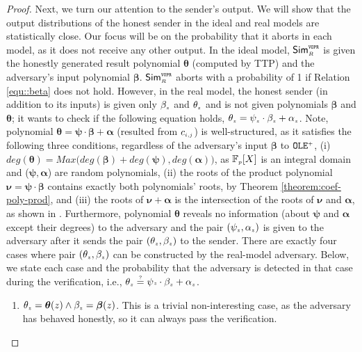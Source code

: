\begin{proof}
Next, we turn our attention to the sender's output. We will show that the output distributions of the honest sender in the ideal and real models are statistically close. 
%
%
Our focus will be on the probability that it aborts in each model, as it does not receive any other output. In the ideal model, $\mathsf{Sim}^{\scriptscriptstyle \mathtt{VOPR}}_{\scriptscriptstyle R}$ is given the honestly generated result polynomial ${\bm \theta}$ (computed by TTP) and the adversary's input polynomial ${\bm \beta}$. $\mathsf{Sim}^{\scriptscriptstyle \mathtt{VOPR}}_{\scriptscriptstyle R}$ aborts with a probability of 1 if Relation \ref{equ::beta} does not hold. However, in the real model, the honest sender (in addition to its inputs) is given only $\beta_{\scriptscriptstyle  z}$ and $\theta_{\scriptscriptstyle  z}$ and is not given polynomials ${\bm\beta}$ and  ${\bm\theta}$; it wants to check if the following equation holds, $\theta_{\scriptscriptstyle z} =  \psi_{\scriptscriptstyle z}\cdot  \beta_{\scriptscriptstyle z}+ \alpha_{\scriptscriptstyle z}$. Note, polynomial $\bm\theta=\bm\psi\cdot \bm\beta+\bm\alpha$ (resulted from ${c}_{\scriptscriptstyle i,j}$) is well-structured, as it satisfies the following three conditions, regardless of the adversary's input $\bm\beta$ to $\mathtt{OLE}^{\scriptscriptstyle +}$, (i) $deg(\bm\theta)=Max \Big(deg(\bm\beta)+deg(\bm\psi), deg(\bm\alpha) \Big)$, as $\mathbb{F}_{\scriptscriptstyle p}[X]$ is an integral domain and ($\bm\psi,\bm\alpha$) are random polynomials, (ii)  the roots of the product polynomial $\bm\nu=\bm\psi\cdot \bm\beta$ contains exactly both polynomials' roots, by Theorem \ref{theorem:coef-poly-prod}, and (iii)  the roots of $\bm\nu+\bm\alpha$ is the intersection of the roots of $\bm\nu$ and $\bm\alpha$, as shown in \cite{DBLP:conf/crypto/KissnerS05}. Furthermore, polynomial $\bm \theta$ reveals no information (about  $\bm \psi$ and $\bm\alpha$ except their degrees) to the adversary and the pair $(\psi_{\scriptscriptstyle z}, \alpha_{\scriptscriptstyle z})$ is given to the adversary after it sends the pair $(\theta_{\scriptscriptstyle z}, \beta_{\scriptscriptstyle z})$ to the sender. 
%
There are exactly four cases where pair $(\theta_{\scriptscriptstyle z}, \beta_{\scriptscriptstyle z})$ can be constructed by the real-model adversary. Below, we state each case and the probability that the adversary is detected in that case during the verification, i.e., $\theta_{\scriptscriptstyle z}\stackrel{\scriptscriptstyle ?}=\psi{\scriptscriptstyle z}\cdot \beta_{\scriptscriptstyle z}+\alpha_{\scriptscriptstyle z}$. 
%
\begin{enumerate}
%
\item $\theta_{\scriptscriptstyle z}= \bm\theta(z) \wedge  \beta_{\scriptscriptstyle  z}={\bm\beta}( z)$. This is a trivial non-interesting case, as the adversary has behaved honestly, so it can always pass the verification. %

\end{enumerate}
\end{proof}
